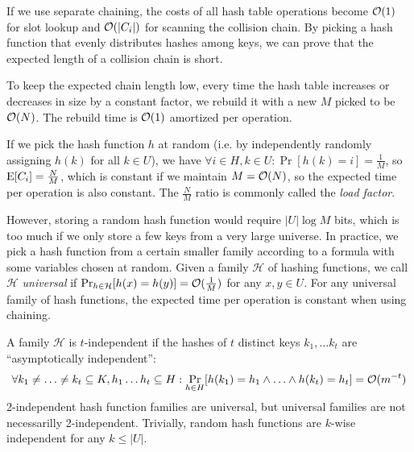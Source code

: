 If we use separate chaining, the costs of all hash table operations become
$\mathcal{O}(1)$ for slot lookup and $\mathcal{O}(|C_i|)$ for scanning the collision chain.
By picking a hash function that evenly distributes hashes among keys,
we can prove that the expected length of a collision chain is short.

To keep the expected chain length low, every time the hash table increases
or decreases in size by a constant factor, we rebuild it with a new $M$
picked to be $\mathcal{O}(N)$. The rebuild time is $\mathcal{O}(1)$ amortized per operation.

If we pick the hash function $h$ at random (i.e. by independently randomly
assigning $h(k)$ for all $k\in U$), we have $\forall i\in H, k\in U:
\Pr[h(k)=i]=\frac{1}{M}$, so $\mathrm{E}[C_i]=\frac{N}{M}$, which is constant if we
maintain $M=\mathcal{O}(N)$, so the expected time per operation is also constant.
The $\frac{N}{M}$ ratio is commonly called the \emph{load factor}.

However, storing a random hash function would require $|U| \log M$ bits, which
is too much if we only store a few keys from a very large universe. In practice,
we pick a hash function from a certain smaller family according to a formula
with some variables chosen at random.
Given a family $\mathcal{H}$ of hashing functions, we call $\mathcal{H}$
\emph{universal} if $\Pr_{h\in \mathcal{H}}[h(x)=h(y)]=\mathcal{O}(\frac{1}{M})$ for any
$x, y\in U$.
For any universal family of hash functions, the expected time per operation
is constant when using chaining.

A family $\mathcal{H}$ is $t$-independent if the hashes of $t$ distinct keys
$k_1,\ldots k_t$ are ``asymptotically independent'':
$$\forall k_1\neq\ldots \neq k_t\subseteq K,
	h_1\ldots h_t\subseteq H: \Pr_{h\in H}[h(k_1)=h_1\wedge \ldots \wedge
	h(k_t)=h_t]=\mathcal{O}(m^{-t})$$
2-independent hash function families are universal, but universal families
are not necessarilly 2-independent.
Trivially, random hash functions are $k$-wise independent for any $k\leq |U|$.


